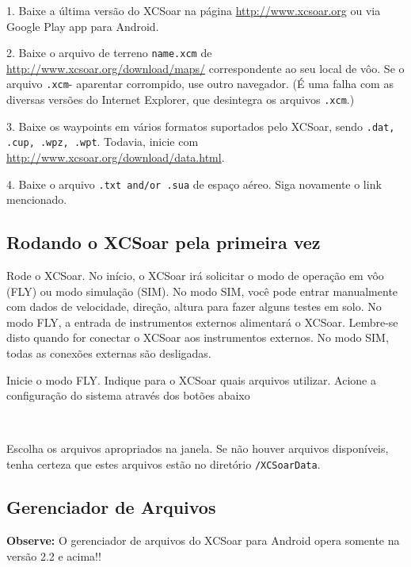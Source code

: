\documentclass[a4paper,12pt,utf8]{scrreprt}
\newcommand{\config}[3]{\bmenut{Config}{#1/3}{\LARGE$\triangleright$}~\bmenut{#2}{#3}}%
\begin{document}
\begin{compactitem}
\item[1.] Baixe a última versão do XCSoar na página 
{\url{http://www.xcsoar.org}} ou via Google Play app para Android.
\item[2.] Baixe o arquivo de terreno \texttt{name.xcm} de 
{\url{http://www.xcsoar.org/download/maps/}}
correspondente ao seu local de vôo.  Se o arquivo \texttt{.xcm}- aparentar corrompido, use outro navegador. (É uma falha com as diversas versões do Internet Explorer, que desintegra os arquivos \texttt{.xcm}.)
\item[3.] Baixe os waypoints em vários formatos suportados pelo XCSoar, sendo \texttt{.dat, .cup, .wpz, .wpt}. Todavia, inicie com {\url{http://www.xcsoar.org/download/data.html}}.
\item[4.] Baixe o arquivo \texttt{.txt and/or .sua} de espaço aéreo.  Siga novamente o link mencionado.
\end{compactitem}

\subsection{\textcolor{flashblue}{Rodando o XCSoar pela primeira vez}}
Rode o XCSoar.  No início, o XCSoar irá solicitar o modo de operação em vôo (FLY) ou modo simulação (SIM).  No modo SIM, você pode entrar manualmente com dados de velocidade, direção, altura para fazer alguns testes em solo.  No modo FLY, a entrada de instrumentos externos alimentará o XCSoar.  Lembre-se disto quando for conectar o XCSoar aos instrumentos externos.  No modo SIM, todas as conexões externas são desligadas.

Inicie o modo FLY.  Indique para o XCSoar quais arquivos utilizar.  Acione a configuração do sistema através dos botões abaixo

\begin{flushleft}\hspace*{1cm}\config{2}{Sistema}{}\blink{}
\blink{}\\\end{flushleft}

Escolha os arquivos apropriados na janela.  Se não houver arquivos disponíveis, tenha certeza que estes arquivos estão no diretório \texttt{/XCSoarData}.

\subsection{\textcolor{flashblue}{Gerenciador de Arquivos}}
\textbf{Observe:} O gerenciador de arquivos do XCSoar para Android opera somente na versão 2.2 e acima!!
\end{document}

